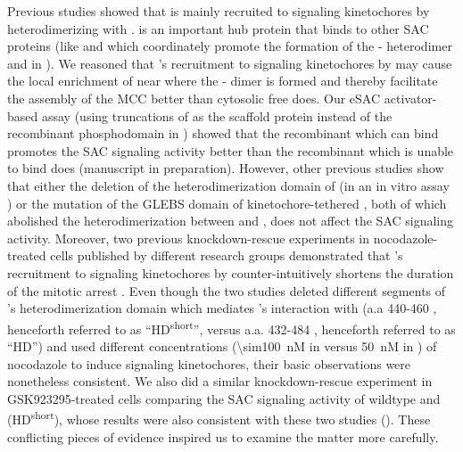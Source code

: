 Previous studies showed that  is mainly recruited to signaling kinetochores by heterodimerizing with  \cite{BubBiochem,BubR1TwoPools}.  is an important hub protein that binds to other SAC proteins (like  and  which coordinately promote the formation of the - heterodimer  and in  \cite{BUB1-CDC20-MAD1,Tripartite}). We reasoned that 's recruitment to signaling kinetochores by  may cause the local enrichment of  near where the - dimer is formed and thereby facilitate the assembly of the MCC better than cytosolic free  does. Our eSAC activator-based assay (using truncations of  as the scaffold protein instead of the recombinant  phosphodomain in ) showed that the recombinant  which can bind  promotes the SAC signaling activity better than the recombinant  which is unable to bind  does (manuscript in preparation). However, other previous studies show that either the deletion of the heterodimerization domain of  (in an in vitro assay \cite{BUB1-CDC20-MAD1}) or the mutation of the GLEBS domain of kinetochore-tethered  \cite{MIS12-BUB1-E252K}, both of which abolished the heterodimerization between  and , does not affect the SAC signaling activity. Moreover, two previous  knockdown-rescue experiments in nocodazole-treated cells published by different research groups demonstrated that 's recruitment to signaling kinetochores by  counter-intuitively shortens the duration of the mitotic arrest \cite{BubR1TwoPools,BubBiochem}. Even though the two studies deleted different segments of 's heterodimerization domain which mediates 's interaction with  (a.a 440-460 \cite{BubR1TwoPools}, henceforth referred to as ``HD\textsuperscript{short}'', versus a.a. \textDelta{}432-484 \cite{BubBiochem}, henceforth referred to as ``HD'') and used different concentrations (\SI{\sim100}{nM} in \cite{BubR1TwoPools} versus \SI{50}{nM} in \cite{BubBiochem}) of nocodazole to induce signaling kinetochores, their basic observations were nonetheless consistent. We also did a similar knockdown-rescue experiment in GSK923295-treated cells comparing the SAC signaling activity of wildtype  and (\textDelta{}HD\textsuperscript{short}), whose results were also consistent with these two studies (). These conflicting pieces of evidence inspired us to examine the matter more carefully.

